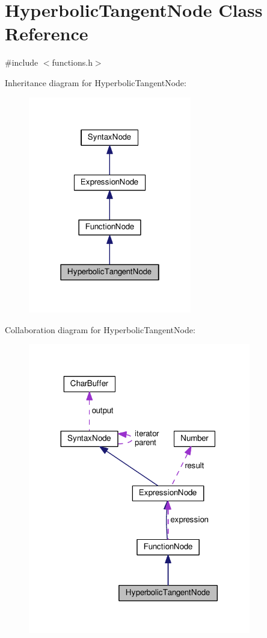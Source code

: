 \hypertarget{classHyperbolicTangentNode}{}\section{Hyperbolic\+Tangent\+Node Class Reference}
\label{classHyperbolicTangentNode}


{\ttfamily \#include $<$functions.\+h$>$}



Inheritance diagram for Hyperbolic\+Tangent\+Node\+:\nopagebreak
\begin{figure}[H]
\begin{center}
\leavevmode
\includegraphics[width=202pt]{classHyperbolicTangentNode__inherit__graph}
\end{center}
\end{figure}


Collaboration diagram for Hyperbolic\+Tangent\+Node\+:\nopagebreak
\begin{figure}[H]
\begin{center}
\leavevmode
\includegraphics[width=275pt]{classHyperbolicTangentNode__coll__graph}
\end{center}
\end{figure}
